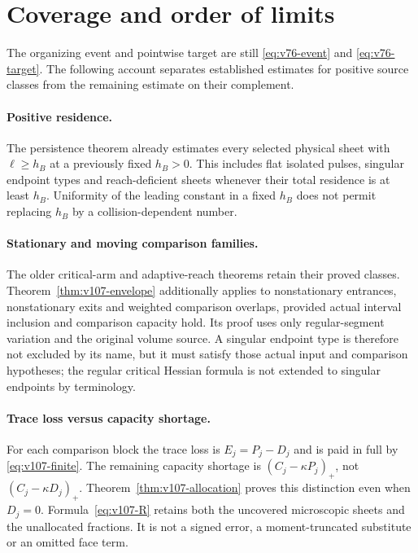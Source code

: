 \section{Coverage and order of limits}
\label{app:v107-coverage}
The organizing event and pointwise target are still
\eqref{eq:v76-event} and \eqref{eq:v76-target}. The following account
separates established estimates for positive source classes from the
remaining estimate on their complement.

\paragraph{Positive residence.}
The persistence theorem already estimates every selected physical
sheet with $\ell\ge h_B$ at a previously fixed $h_B>0$. This includes
flat isolated pulses, singular endpoint types and reach-deficient
sheets whenever their total residence is at least $h_B$. Uniformity
of the leading constant in a fixed $h_B$ does not permit replacing
$h_B$ by a collision-dependent number.

\paragraph{Stationary and moving comparison families.}
The older critical-arm and adaptive-reach theorems retain their
proved classes. Theorem~\ref{thm:v107-envelope} additionally applies
to nonstationary entrances, nonstationary exits and weighted
comparison overlaps, provided actual interval inclusion and
comparison capacity hold. Its proof uses only regular-segment
variation and the original volume source. A singular endpoint type
is therefore not excluded by its name, but it must satisfy those
actual input and comparison hypotheses; the regular critical Hessian
formula is not extended to singular endpoints by terminology.

\paragraph{Trace loss versus capacity shortage.}
For each comparison block the trace loss is $E_j=P_j-D_j$ and is
paid in full by \eqref{eq:v107-finite}. The remaining capacity
shortage is $(C_j-\kappa P_j)_+$, not $(C_j-\kappa D_j)_+$.
Theorem~\ref{thm:v107-allocation} proves this distinction even when
$D_j=0$. Formula~\eqref{eq:v107-R} retains both the uncovered
microscopic sheets and the unallocated fractions. It is not a
signed error, a moment-truncated substitute or an omitted face term.


